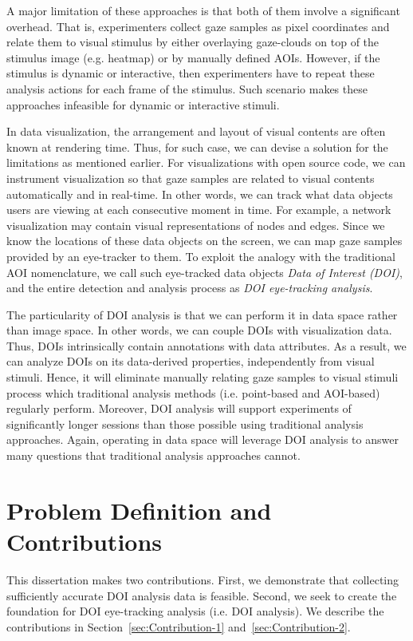 A major limitation of these approaches is that both of them involve a significant overhead. That is, experimenters collect gaze samples as pixel coordinates and relate them to visual stimulus by either overlaying gaze-clouds on top of the stimulus image (e.g. heatmap) or by manually defined AOIs. However, if the stimulus is dynamic or interactive, then experimenters have to repeat these analysis actions for each frame of the stimulus. Such scenario makes these approaches infeasible for dynamic or interactive stimuli.

In data visualization, the arrangement and layout of visual contents are often known at rendering time. Thus, for such case, we can devise a solution for the limitations as mentioned earlier. For visualizations with open source code, we can instrument visualization so that gaze samples are related to visual contents automatically and in real-time. In other words, we can track what data objects users are viewing at each consecutive moment in time. For example, a network visualization may contain visual representations of nodes and edges. Since we know the locations of these data objects on the screen, we can map gaze samples provided by an eye-tracker to them. To exploit the analogy with the traditional AOI nomenclature, we call such eye-tracked data objects \textit{Data of Interest (DOI)}, and the entire detection and analysis process as \textit{DOI eye-tracking analysis}. 

The particularity of DOI analysis is that we can perform it in data space rather than image space. In other words, we can couple DOIs with visualization data. Thus, DOIs intrinsically contain annotations with data attributes. As a result, we can analyze DOIs on its data-derived properties, independently from visual stimuli. Hence, it will eliminate manually relating gaze samples to visual stimuli process which traditional analysis methods (i.e. point-based and AOI-based) regularly perform. Moreover, DOI analysis will support experiments of significantly longer sessions than those possible using traditional analysis approaches. Again, operating in data space will leverage DOI analysis to answer many questions that traditional analysis approaches cannot. 

\section{Problem Definition and Contributions}
\label{sec:ProblemContribution}
This dissertation makes two contributions. First, we demonstrate that collecting sufficiently accurate DOI analysis data is feasible. Second, we seek to create the foundation for DOI eye-tracking analysis (i.e. DOI analysis). We describe the contributions in Section~\ref{sec:Contribution-1} and~\ref{sec:Contribution-2}. 

